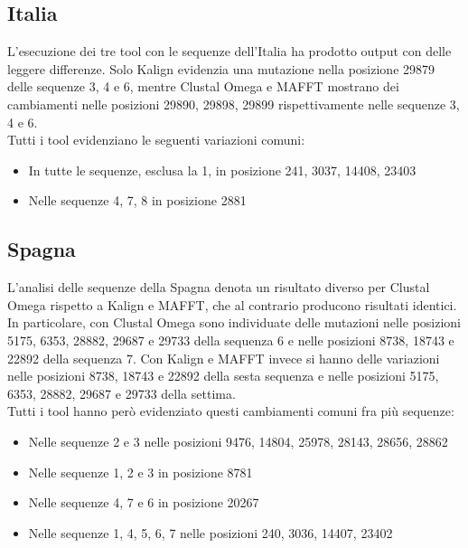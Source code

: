 \documentclass[a4paper,10pt]{article}
\begin{document}
\subsection{Italia}
L'esecuzione dei tre tool con le sequenze dell'Italia ha prodotto output con delle leggere differenze. Solo Kalign evidenzia una mutazione nella posizione 29879 delle sequenze 3, 4 e 6, mentre Clustal Omega e MAFFT mostrano dei cambiamenti nelle posizioni 29890, 29898, 29899 rispettivamente nelle sequenze 3, 4 e 6.\\ %
Tutti i tool evidenziano le seguenti variazioni comuni:
\begin{itemize}
\item In tutte le sequenze, esclusa la 1, in posizione 241, 3037, 14408, 23403
\item Nelle sequenze 4, 7, 8 in posizione 2881 
\end{itemize}



\subsection{Spagna}
L'analisi delle sequenze della Spagna denota un risultato diverso per Clustal Omega rispetto a Kalign e MAFFT, che al contrario producono risultati identici. \\
In particolare, con Clustal Omega sono individuate delle mutazioni nelle posizioni  5175, 6353, 28882, 29687 e 29733 della sequenza 6 e nelle posizioni 8738, 18743 e 22892 della sequenza 7.
Con Kalign e MAFFT invece si hanno delle variazioni nelle posizioni 8738, 18743 e 22892 della sesta sequenza e nelle posizioni 5175, 6353, 28882, 29687 e 29733 della settima.\\

Tutti i tool hanno però evidenziato questi cambiamenti comuni fra più sequenze:

\begin{itemize}
\item Nelle sequenze 2 e 3 nelle posizioni 9476, 14804, 25978, 28143, 28656, 28862
\item Nelle sequenze 1, 2 e 3 in posizione 8781
\item Nelle sequenze 4, 7 e 6 in posizione 20267
\item Nelle sequenze 1, 4, 5, 6, 7 nelle posizioni 240, 3036, 14407, 23402
\end{itemize}
\end{document}
